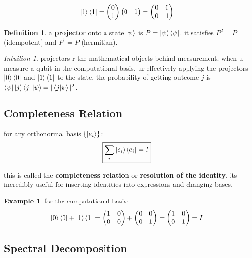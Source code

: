 \documentclass[11pt,a4paper]{article}
\theoremstyle{definition}
\newtheorem{definition}{Definition}[section]
\newtheorem{example}{Example}[section]
\theoremstyle{remark}
\newtheorem*{intuition}{Intuition}
\begin{document}
\[
\ket{1}\bra{1} = \begin{pmatrix} 0 \\ 1 \end{pmatrix} \begin{pmatrix} 0 & 1 \end{pmatrix} = \begin{pmatrix} 0 & 0 \\ 0 & 1 \end{pmatrix}
\]

\begin{definition}
a \textbf{projector} onto a state $\ket{\psi}$ is $P = \ket{\psi}\bra{\psi}$. it satisfies $P^2 = P$ (idempotent) and $P^\dagger = P$ (hermitian).
\end{definition}

\begin{intuition}
projectors r the mathematical objects behind measurement. when u measure a qubit in the computational basis, ur effectively applying the projectors $\ket{0}\bra{0}$ and $\ket{1}\bra{1}$ to the state. the probability of getting outcome $j$ is $\bra{\psi}\ket{j}\bra{j}\ket{\psi} = |\braket{j|\psi}|^2$.
\end{intuition}

\subsection{Completeness Relation}

for any orthonormal basis $\{\ket{e_i}\}$:
\[
\boxed{\sum_i \ket{e_i}\bra{e_i} = I}
\]

this is called the \textbf{completeness relation} or \textbf{resolution of the identity}. its incredibly useful for inserting identities into expressions and changing bases.

\begin{example}
for the computational basis:
\[
\ket{0}\bra{0} + \ket{1}\bra{1} = \begin{pmatrix} 1 & 0 \\ 0 & 0 \end{pmatrix} + \begin{pmatrix} 0 & 0 \\ 0 & 1 \end{pmatrix} = \begin{pmatrix} 1 & 0 \\ 0 & 1 \end{pmatrix} = I
\]
\end{example}

\subsection{Spectral Decomposition}
\end{document}

